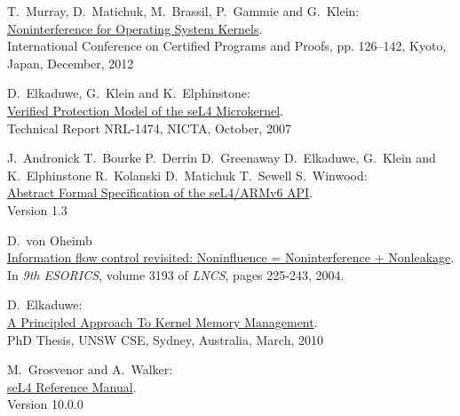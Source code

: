 \documentclass[pdftex,11pt,a4paper]{article}
\begin{document}
	\begin{thebibliography}{99}

	T.\ Murray, D.\ Matichuk, M.\ Brassil, P.\ Gammie and G.\ Klein:	\\ 
	\href{http://www.ssrg.nicta.com/publications/nicta_full_text/6004.pdf}{%
		Noninterference for Operating System Kernels}. \\
    International Conference on Certified Programs and Proofs, pp. 126–142, Kyoto, Japan, December, 2012

	D.\ Elkaduwe, G.\ Klein and K.\ Elphinstone:	\\ 
	\href{http://ts.data61.csiro.au/publications/nicta_full_text/1474.pdf}{%
		Verified Protection Model of the seL4 Microkernel}. \\
   	Technical Report NRL-1474, NICTA, October, 2007
   	
	J.\ Andronick T.\ Bourke P.\ Derrin D.\ Greenaway D.\ Elkaduwe, G.\ Klein and K.\ Elphinstone R.\ Kolanski D.\ Matichuk T.\ Sewell S.\ Winwood:	\\ 
	\href{https://sel4.systems/Info/Docs/seL4-spec.pdf}{%
		Abstract Formal Specification of the seL4/ARMv6 API}. \\
   	Version 1.3
   	
	D.\ von Oheimb	\\ 
	\href{https://pdfs.semanticscholar.org/21ea/6c722535ed0a22175187796b43c114e14ee8.pdf}{%
		Information flow control revisited: Noninfluence = Noninterference + Nonleakage}. \\
   	In \textit{9th ESORICS}, volume 3193 of \textit{LNCS}, pages 225-243, 2004.
   	
	D.\ Elkaduwe:	\\ 
	\href{https://ts.data61.csiro.au/publications/papers/Elkaduwe:phd.pdf}{%
		A Principled Approach To Kernel Memory Management}. \\
   	PhD Thesis, UNSW CSE, Sydney, Australia, March, 2010

	M.\ Grosvenor and A.\ Walker:	\\ 
	\href{http://sel4.systems/Info/Docs/seL4-manual-latest.pdf}{%
		seL4 Reference Manual}. \\
   	Version 10.0.0
\end{thebibliography}
	
\end{document}
